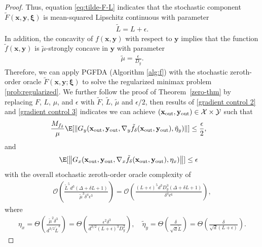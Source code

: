 \documentclass[11pt]{article}
\def\vx{\mathbf{x}}
\def\vy{\mathbf{y}}
\def\vxi{\bm{\xi}}
\def\fO{{\mathcal{O}}}
\def\fX{{\mathcal{X}}}
\def\fY{{\mathcal{Y}}}
\newcommand{\norm}[1]{\left\| #1 \right\|}
\begin{document}
\begin{proof}
Thus, equation \eqref{eq:tilde-F-L} indicates that the stochastic component $\tilde{F}(\vx,\vy,\vxi)$ is mean-squared Lipschitz continuous with parameter
\begin{align*}
\tilde{L}=L+\epsilon.    
\end{align*}
In addition, the concavity of $f(\vx,\vy)$ with respect to $\vy$ implies that the function $\tilde{f}(\vx,\vy)$ is $\tilde \mu$-strongly concave in $\vy$ with parameter
\begin{align*}
\tilde{\mu}=\frac{\epsilon}{D_y}.    
\end{align*}
Therefore, we can apply PGFDA (Algorithm \ref{alg:f}) with the stochastic zeroth-order oracle $\tilde F(\vx,\vy;\vxi)$ to solve the regularized minimax problem \eqref{prob:regularized}.
We further follow the proof of Theorem~\ref{zero-thm} by replacing 
$F$, $L$, $\mu$, and $\epsilon$ with $\tilde F$, $\tilde L$, $\tilde \mu$ and $\epsilon/2$, then results of \eqref{gradient control 2} and \eqref{gradient control 3} 
indicates we can achieve $(\vx_{\rm out}, \vy_{\rm out})\in\fX\times\fY$ such that
\begin{align}\label{gradient control 2: regularize}
\begin{split}
&\frac{M_{f_\delta}}{\mu}\E[\| G_y(\vx_{\mathrm{out}}, \vy_{\mathrm{out}},\nabla_y \tilde f_\delta(\vx_{\mathrm{out}},\vy_{\mathrm{out}}),\tilde\eta_y) 
\|]
\leq
\frac{\epsilon}{2},
\end{split}
\end{align}
and
\begin{align}\label{gradient control 3: regularize}
\begin{split}
&\E[\norm{G_x(\vx_{\mathrm{out}},\vy_{\mathrm{out}},\nabla_x \tilde f_\delta(\vx_{\mathrm{out}},\vy_{\mathrm{out}}),\eta_x)}]\le\epsilon
\end{split}
\end{align}
with the overall stochastic zeroth-order oracle complexity of
\begin{align*}
\fO\left(\frac{\tilde L^5 d^{3}(
\Delta+\delta L+ 1)}{\tilde \mu^3 \delta^4 \epsilon^3}\right)=\fO\left(\frac{(L+\epsilon)^5 d^{3}D_y^3 (
\Delta+\delta L+ 1)}{ \delta^4 \epsilon^6}\right),   
\end{align*}
where
\begin{align*}    \eta_x=\Theta\left(\frac{\tilde\mu^2\delta^3}{d^{3/2}\tilde L^3}\right)=\Theta\left(\frac{\epsilon^2\delta^3}{d^{3/2}(L+\epsilon)^3D_y^2}\right),
\quad\tilde\eta_y=\Theta\left(\frac{\delta}{\sqrt{d}\tilde L}\right)=\Theta\left(\frac{\delta}{\sqrt{d} (L+\epsilon)}\right).
\end{align*}



\end{proof}
\end{document}
